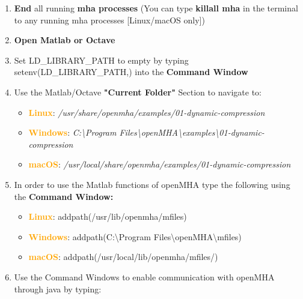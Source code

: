 \documentclass[11pt,a4paper,twoside]{article}
\newcommand{\+}{\discretionary{\mbox{\scriptsize$\hookleftarrow$}}{}{}}
\begin{document}
{{%

\begin{enumerate}
\item \textbf{End} all running \textbf{mha processes} (You can type \textbf{killall mha} in the terminal to any running mha processes [Linux/macOS only])
\item \textbf{Open Matlab or Octave}
\item Set LD\_LIBRARY\_PATH to empty by typing {\ttfamily setenv(\textquotesingle{}LD\_LIBRARY\_PATH\textquotesingle{},\textquotesingle{}\textquotesingle{})} into the \textbf{Command Window}
\item Use the Matlab/Octave \textbf{"Current Folder"} Section to navigate to:

\begin{itemize}
\item \textcolor{orange}{\textbf{Linux}}: \textit{/usr/share/openmha/examples/01-dynamic-compression} 
\item \textcolor{orange}{\textbf{Windows}}: \textit{C:\textbackslash Program Files\textbackslash openMHA\textbackslash examples\textbackslash 01-dynamic-compression}
\item \textcolor{orange}{\textbf{macOS}}: \textit{/usr/local/share/openmha/examples/01-dynamic-compression} 
\end{itemize}

\item In order to use the Matlab functions of openMHA type the following using the \textbf{Command Window:} 

\begin{itemize}
\item \textcolor{orange}{\textbf{Linux}}: {\ttfamily addpath(\textquotesingle{}/usr/lib/openmha/mfiles\textquotesingle{})}
\item \textcolor{orange}{\textbf{Windows}}: {\ttfamily addpath(\textquotesingle{}C:\textbackslash Program Files\textbackslash openMHA\textbackslash mfiles\textquotesingle{})}
\item \textcolor{orange}{\textbf{macOS}}: {\ttfamily addpath(\textquotesingle{}/usr/local/lib/openmha/mfiles/\textquotesingle{})}
\end{itemize}


\item Use the Command Windows to enable communication with openMHA through java by typing: 


\end{enumerate}}}
\end{document}
